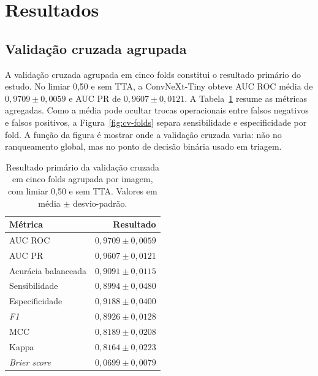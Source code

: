 ﻿\section{Resultados}

\subsection{Validação cruzada agrupada}

A validação cruzada agrupada em cinco folds constitui o resultado primário do
estudo. No limiar 0,50 e sem TTA, a ConvNeXt-Tiny obteve AUC ROC média de
$0{,}9709\pm0{,}0059$ e AUC PR de $0{,}9607\pm0{,}0121$. A
Tabela~\ref{tab:cv-media} resume as métricas agregadas. Como a média pode ocultar
trocas operacionais entre falsos negativos e falsos positivos, a
Figura~\ref{fig:cv-folds} separa sensibilidade e especificidade por fold. A
função da figura é mostrar onde a validação cruzada varia: não no ranqueamento
global, mas no ponto de decisão binária usado em triagem.

\begin{table}[ht]
\centering
\caption{Resultado primário da validação cruzada em cinco folds agrupada por
imagem, com limiar 0,50 e sem TTA. Valores em média $\pm$ desvio-padrão.}
\label{tab:cv-media}
\begin{tabular}{lr}
\toprule
Métrica & Resultado \\
\midrule
AUC ROC & $0{,}9709\pm0{,}0059$ \\
AUC PR & $0{,}9607\pm0{,}0121$ \\
Acurácia balanceada & $0{,}9091\pm0{,}0115$ \\
Sensibilidade & $0{,}8994\pm0{,}0480$ \\
Especificidade & $0{,}9188\pm0{,}0400$ \\
\emph{F1} & $0{,}8926\pm0{,}0128$ \\
MCC & $0{,}8189\pm0{,}0208$ \\
Kappa & $0{,}8164\pm0{,}0223$ \\
\emph{Brier score} & $0{,}0699\pm0{,}0079$ \\
\bottomrule
\end{tabular}
\end{table}

